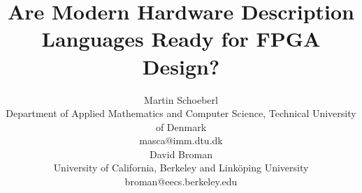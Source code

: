 \documentclass[10pt, conference, compsocconf]{IEEEtran}
\begin{document}
\newcommand{\shdl} {
  \lstset{keywords={comp,end,def,in,out,if,then,else,true,false,
      int,real,bool,string,int1,int2,int3,int4,int5,int6,int7,int8,
      int16,int32,type}, 
    morecomment=[l]{//},
    morecomment=[s]{/*}{*/}, morestring=[b]{"},
    basicstyle=\ttfamily\small, showstringspaces=false,
    keywordstyle=\bfseries, mathescape=true, }}



\title{Are Modern Hardware Description Languages Ready for FPGA Design?}
\author{Martin Schoeberl\\
Department of Applied Mathematics and Computer Science, 
Technical University of Denmark\\masca@imm.dtu.dk
  \vspace{1ex}\\ 
David Broman\\
University of California, Berkeley and Link{\"o}ping University\\
broman@eecs.berkeley.edu
}



\maketitle \thispagestyle{empty}
\end{document}
